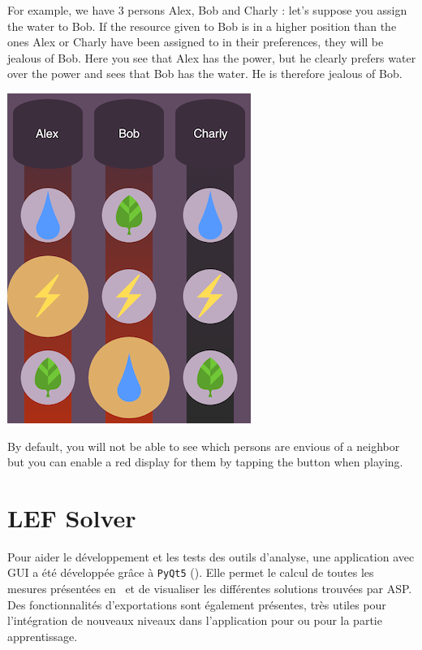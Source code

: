 \documentclass[a4paper, 11pt, titlepage]{article}
\newenvironment{figurecol}
  {\par\medskip\noindent\minipage{\linewidth}}
  {\endminipage\par\medskip}
\begin{document}
\begin{appendix}
\begin{multicols}{2}
{    For example, we have 3 persons Alex, Bob and Charly : let's suppose you assign the water to Bob. If the resource given to Bob is in a higher position than the ones Alex or Charly have been assigned to in their preferences, they will be jealous of Bob. Here you see that Alex has the power, but he clearly prefers water over the power and sees that Bob has the water. He is therefore jealous of Bob.
    
    \begin{figurecol}
        \centering
        \includegraphics[width=0.8\linewidth]{tutorial2}
    \end{figurecol}
    By default, you will not be able to see which persons are envious of a neighbor but you can enable a red display for them by tapping the button  when playing.
    }
    \end{multicols}
    \newpage
    \section{LEF Solver}
Pour aider le développement et les tests des outils d'analyse, une application avec GUI a été développée grâce à \texttt{PyQt5} (). Elle permet le calcul de toutes les mesures présentées en~ et de visualiser les différentes solutions trouvées par ASP. Des fonctionnalités d'exportations sont également présentes, très utiles pour l'intégration de nouveaux niveaux dans l'application pour ou pour la partie apprentissage.


\end{appendix}
\end{document}
